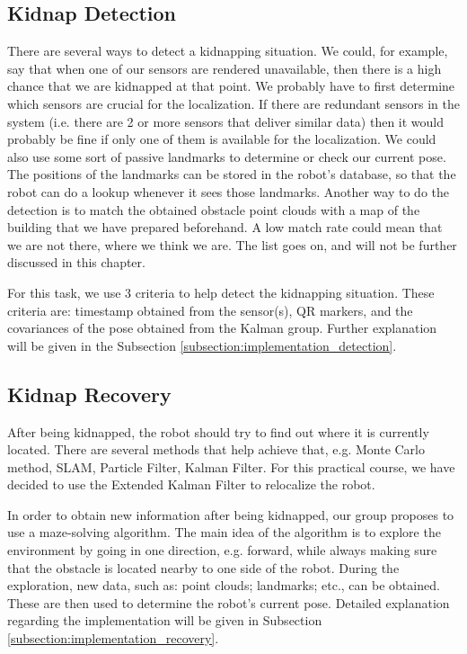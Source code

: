 \subsection{Kidnap Detection} \label{subsection:concept_detection}
There are several ways to detect a kidnapping situation. We could, for example, say that when one of our sensors are rendered unavailable, then there is a high chance that we are kidnapped at that point. We probably have to first determine which sensors are crucial for the localization. If there are redundant sensors in the system (i.e. there are 2 or more sensors that deliver similar data) then it would probably be fine if only one of them is available for the localization. We could also use some sort of passive landmarks to determine or check our current pose. The positions of the landmarks can be stored in the robot's database, so that the robot can do a lookup whenever it sees those landmarks. Another way to do the detection is to match the obtained obstacle point clouds with a map of the building that we have prepared beforehand. A low match rate could mean that we are not there, where we think we are. The list goes on, and will not be further discussed in this chapter.

For this task, we use 3 criteria to help detect the kidnapping situation. These criteria are: timestamp obtained from the sensor(s), QR markers, and the covariances of the pose obtained from the Kalman group. Further explanation will be given in the Subsection \ref{subsection:implementation_detection}. 

\subsection{Kidnap Recovery} \label{subsection:concept_recovery}

After being kidnapped, the robot should try to find out where it is currently located. There are several methods that help achieve that, e.g. Monte Carlo method, SLAM, Particle Filter, Kalman Filter. For this practical course, we have decided to use the Extended Kalman Filter to relocalize the robot.

In order to obtain new information after being kidnapped, our group proposes to use a maze-solving algorithm. The main idea of the algorithm is to explore the environment by going in one direction, e.g. forward, while always making sure that the obstacle is located nearby to one side of the robot. During the exploration, new data, such as: point clouds; landmarks; etc., can be obtained. These are then used to determine the robot's current pose. Detailed explanation regarding the implementation will be given in Subsection \ref{subsection:implementation_recovery}.





